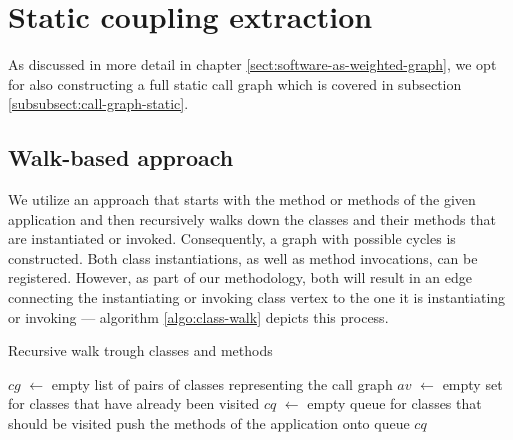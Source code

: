 \documentclass[12pt,a4paper]{report}
\begin{document}
\section{Static coupling extraction} \label{sect:static-coupling-extraction}

As discussed in more detail in chapter \ref{sect:software-as-weighted-graph},
we opt for also constructing a full static call graph which is covered in
subsection \ref{subsubsect:call-graph-static}.


\subsection{Walk\hyp based approach}

We utilize an approach that starts with the  method or methods of
the given application and then recursively walks down the classes and their
methods that are instantiated or invoked. Consequently, a graph with possible
cycles is constructed. Both class instantiations, as well as method
invocations, can be registered. However, as part of our methodology, both will
result in an edge connecting the instantiating or invoking class vertex to the
one it is instantiating or invoking --- algorithm \ref{algo:class-walk} depicts
this process.

\begin{algorithm}[ht]
\caption{Recursive walk trough classes and methods}
\label{algo:class-walk}
  \BlankLine
  \BlankLine
  $cg$ $\leftarrow$ empty list of pairs of classes representing the call graph\;
  $av$ $\leftarrow$ empty set for classes that have already been visited\;
  $cq$ $\leftarrow$ empty queue for classes that should be visited\;
  \BlankLine
  push the  methods of the application onto queue $cq$\;
  \BlankLine
  \BlankLine
  \;
\end{algorithm}
\end{document}
